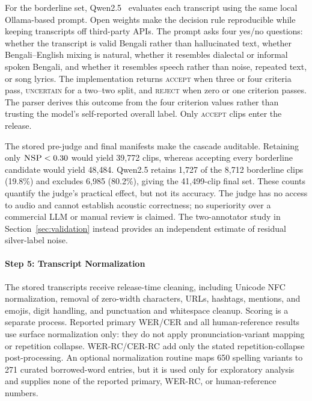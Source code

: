 \documentclass[journal]{IEEEtran}
\begin{document}
For the borderline set, Qwen2.5~\cite{qwen2025} evaluates each transcript using
the same local Ollama-based prompt. Open weights make the decision rule
reproducible while keeping transcripts off third-party APIs. The prompt asks
four yes/no questions: whether the transcript is valid Bengali rather than
hallucinated text, whether Bengali--English mixing is natural, whether it
resembles dialectal or informal spoken Bengali, and whether it resembles speech
rather than noise, repeated text, or song lyrics. The implementation returns
\textsc{accept} when three or four criteria pass, \textsc{uncertain} for a
two--two split, and \textsc{reject} when zero or one criterion passes. The
parser derives this outcome from the four criterion values rather than trusting
the model's self-reported overall label. Only
\textsc{accept} clips enter the release.

The stored pre-judge and final manifests make the cascade auditable. Retaining
only $\textsc{NSP}<0.30$ would yield 39{,}772 clips, whereas accepting every
borderline candidate would yield 48{,}484. Qwen2.5 retains 1{,}727 of the
8{,}712 borderline clips (19.8\%) and excludes 6{,}985 (80.2\%), giving the
41{,}499-clip final set. These counts quantify the judge's practical effect, but
not its accuracy. The judge has no access to audio and cannot establish
acoustic correctness; no superiority over a commercial LLM or manual review is
claimed. The two-annotator study in Section~\ref{sec:validation} instead
provides an independent estimate of residual silver-label noise.

\paragraph*{Step 5: Transcript Normalization}

The stored transcripts receive release-time cleaning, including Unicode NFC
normalization, removal of zero-width characters, URLs, hashtags, mentions, and
emojis, digit handling, and punctuation and whitespace cleanup. Scoring is a
separate process. Reported primary WER/CER and all human-reference results use
surface normalization only: they do not apply pronunciation-variant mapping or
repetition collapse. WER-RC/CER-RC add only the stated repetition-collapse
post-processing. An optional normalization routine maps 650 spelling variants
to 271 curated borrowed-word entries, but it is used only for exploratory
analysis and supplies none of the reported primary, WER-RC, or human-reference
numbers.
\end{document}
